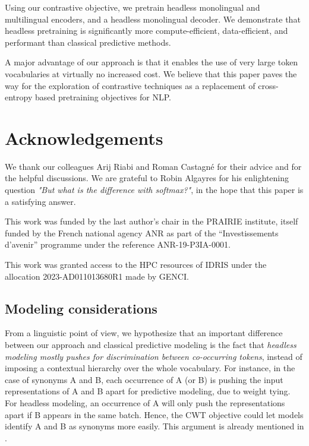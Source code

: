 Using our contrastive objective, we pretrain headless monolingual and multilingual encoders, and a headless monolingual decoder. We demonstrate that headless pretraining is significantly more compute-efficient, data-efficient, and performant than classical predictive methods.

A major advantage of our approach is that it enables the use of very large token vocabularies at virtually no increased cost.
%
We believe that this paper paves the way for the exploration of contrastive techniques as a replacement of cross-entropy based pretraining objectives for NLP.






\section*{Acknowledgements}

We thank our colleagues Arij Riabi and Roman Castagné for their advice and for the helpful discussions. We are grateful to Robin Algayres for his enlightening question \textit{"But what is the difference with softmax?"}, in the hope that this paper is a satisfying answer.

This work was funded by the last author's chair in the PRAIRIE institute, itself funded by the French national agency ANR as part of the ``Investissements d'avenir'' programme under the reference ANR-19-P3IA-0001. 

This work was granted access to the HPC resources of IDRIS under the allocation 2023-AD011013680R1 made by GENCI.

% 
% 



\subsection{Modeling considerations} 

From a linguistic point of view, we hypothesize that an important difference between our approach and classical predictive modeling is the fact that \textit{headless modeling mostly pushes for discrimination between co-occurring tokens}, instead of imposing a contextual hierarchy over the whole vocabulary. For instance, in the case of synonyms A and B, each occurrence of A (or B) is pushing the input representations of A and B apart for predictive modeling, due to weight tying. For headless modeling, an occurrence of A will only push the representations apart if B appears in the same batch. Hence, the CWT objective could let models identify A and B as synonyms more easily. This argument is already mentioned in \citet{jean-etal-2015-using}.

